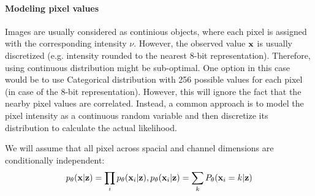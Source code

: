 \paragraph{Modeling pixel values}
Images are usually considered as continious objects, where each pixel is assigned with the corresponding intensity $\nu$. 
However, the observed value ${\mathbf{x}}$ is usually discretized (e.g. intensity rounded to the nearest 8-bit representation). 
Therefore, using continuous distribution might be sub-optimal.
One option in this case would be to use Categorical distribution with 256 possible values for each pixel (in case of the 8-bit representation). However, this will ignore the fact that the nearby pixel values are correlated. 
Instead, a common approach is to model the pixel intensity as a continuous random variable and then discretize its distribution to calculate the actual likelihood. 

We will assume that all pixel across spacial and channel dimensions are conditionally independent:
\begin{equation}
    p_{\theta}({\mathbf{x}}|{\mathbf{z}}) = \prod_i p_{\theta}({\mathbf{x}}_i|{\mathbf{z}}),\\
    p_{\theta}({\mathbf{x}}_i|{\mathbf{z}}) = \sum_{k} P_{\theta}({\mathbf{x}}_i = k|{\mathbf{z}})
\end{equation}

\begin{marginfigure}
\end{marginfigure}

